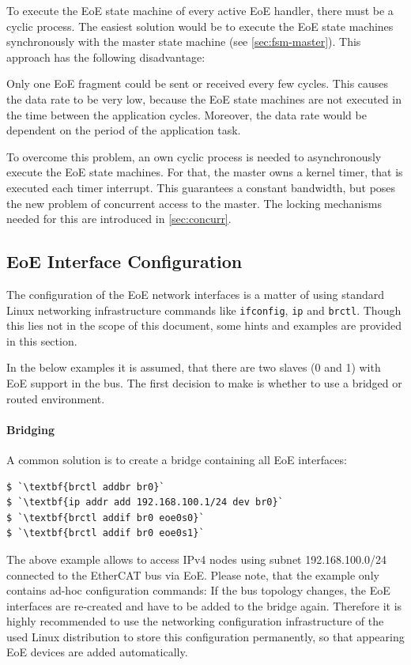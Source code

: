 \documentclass[a4paper,12pt,BCOR=6mm,bibtotoc,idxtotoc]{scrbook}
\begin{document}
To execute the EoE state machine of every active EoE handler, there must be a
cyclic process. The easiest solution would be to execute the EoE state
machines synchronously with the master state machine (see
\autoref{sec:fsm-master}). This approach has the following disadvantage:

Only one EoE fragment could be sent or received every few cycles. This
causes the data rate to be very low, because the EoE state machines are not
executed in the time between the application cycles. Moreover, the data rate
would be dependent on the period of the application task.

To overcome this problem, an own cyclic process is needed to asynchronously
execute the EoE state machines. For that, the master owns a kernel timer, that
is executed each timer interrupt. This guarantees a constant bandwidth, but
poses the new problem of concurrent access to the master. The locking
mechanisms needed for this are introduced in \autoref{sec:concurr}.

\subsection{EoE Interface Configuration}
\label{sec:eoe-config}

The configuration of the EoE network interfaces is a matter of using standard
Linux networking infrastructure commands like \lstinline+ifconfig+,
\lstinline+ip+ and \lstinline+brctl+. Though this lies not in the scope of
this document, some hints and examples are provided in this section.

In the below examples it is assumed, that there are two slaves (0 and 1) with
EoE support in the bus. The first decision to make is whether to use a bridged
or routed environment.

\paragraph{Bridging} A common solution is to create a bridge containing all EoE
interfaces:

\begin{lstlisting}
$ `\textbf{brctl addbr br0}`
$ `\textbf{ip addr add 192.168.100.1/24 dev br0}`
$ `\textbf{brctl addif br0 eoe0s0}`
$ `\textbf{brctl addif br0 eoe0s1}`
\end{lstlisting}

The above example allows to access IPv4 nodes using subnet 192.168.100.0/24
connected to the EtherCAT bus via EoE. Please note, that the example only
contains ad-hoc configuration commands: If the bus topology changes, the EoE
interfaces are re-created and have to be added to the bridge again. Therefore
it is highly recommended to use the networking configuration infrastructure of
the used Linux distribution to store this configuration permanently, so that
appearing EoE devices are added automatically.
\end{document}

